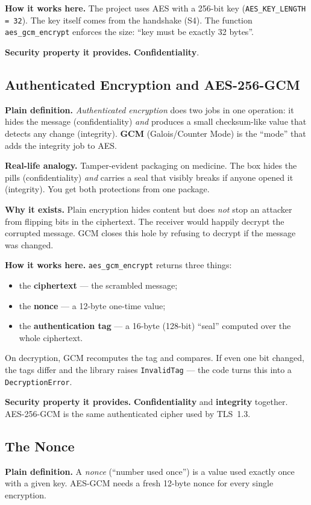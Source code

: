 \documentclass[11pt,a4paper]{article}
\begin{document}
\textbf{How it works here.} The project uses AES with a 256-bit key
(\texttt{AES\_KEY\_LENGTH = 32}). The key itself comes from the handshake (S4).
The function \texttt{aes\_gcm\_encrypt} enforces the size: ``key must be exactly
32 bytes''.

\textbf{Security property it provides.} \textbf{Confidentiality}.

\subsection{Authenticated Encryption and AES-256-GCM}
\textbf{Plain definition.} \emph{Authenticated encryption} does two jobs in one
operation: it hides the message (confidentiality) \emph{and} produces a small
checksum-like value that detects any change (integrity). \textbf{GCM}
(Galois/Counter Mode) is the ``mode'' that adds the integrity job to AES.

\textbf{Real-life analogy.} Tamper-evident packaging on medicine. The box hides
the pills (confidentiality) \emph{and} carries a seal that visibly breaks if
anyone opened it (integrity). You get both protections from one package.

\textbf{Why it exists.} Plain encryption hides content but does \emph{not} stop
an attacker from flipping bits in the ciphertext. The receiver would happily
decrypt the corrupted message. GCM closes this hole by refusing to decrypt if
the message was changed.

\textbf{How it works here.} \texttt{aes\_gcm\_encrypt} returns three things:
\begin{itemize}
  \item the \textbf{ciphertext} --- the scrambled message;
  \item the \textbf{nonce} --- a 12-byte one-time value;
  \item the \textbf{authentication tag} --- a 16-byte (128-bit) ``seal''
        computed over the whole ciphertext.
\end{itemize}
On decryption, GCM recomputes the tag and compares. If even one bit changed, the
tags differ and the library raises \texttt{InvalidTag} --- the code turns this
into a \texttt{DecryptionError}.

\textbf{Security property it provides.} \textbf{Confidentiality} and
\textbf{integrity} together. AES-256-GCM is the same authenticated cipher used
by TLS~1.3.

\subsection{The Nonce}
\textbf{Plain definition.} A \emph{nonce} (``number used once'') is a value used
exactly once with a given key. AES-GCM needs a fresh 12-byte nonce for every
single encryption.
\end{document}
